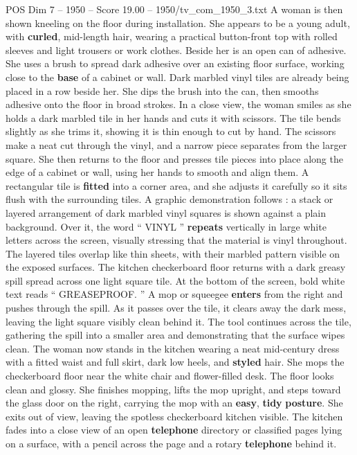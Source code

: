 \begin{textsample}{POS Dim 7 – 1950 – Score 19.00 – 1950/tv\_com\_1950\_3.txt}
A woman is then shown kneeling on the floor during installation.
She appears to be a young adult, with \textbf{curled}, mid-length hair, wearing a practical button-front top with rolled sleeves and light trousers or work clothes.
Beside her is an open can of adhesive.
She uses a brush to spread dark adhesive over an existing floor surface, working close to the \textbf{base} of a cabinet or wall.
Dark marbled vinyl tiles are already being placed in a row beside her.
She dips the brush into the can, then smooths adhesive onto the floor in broad strokes.
In a close view, the woman smiles as she holds a dark marbled tile in her hands and cuts it with scissors.
The tile bends slightly as she trims it, showing it is thin enough to cut by hand.
The scissors make a neat cut through the vinyl, and a narrow piece separates from the larger square.
She then returns to the floor and presses tile pieces into place along the edge of a cabinet or wall, using her hands to smooth and align them.
A rectangular tile is \textbf{fitted} into a corner area, and she adjusts it carefully so it sits flush with the surrounding tiles.
A graphic demonstration follows : a stack or layered arrangement of dark marbled vinyl squares is shown against a plain background.
Over it, the word “ VINYL ” \textbf{repeats} vertically in large white letters across the screen, visually stressing that the material is vinyl throughout.
The layered tiles overlap like thin sheets, with their marbled pattern visible on the exposed surfaces.
The kitchen checkerboard floor returns with a dark greasy spill spread across one light square tile.
At the bottom of the screen, bold white text reads “ GREASEPROOF. ” A mop or squeegee \textbf{enters} from the right and pushes through the spill.
As it passes over the tile, it clears away the dark mess, leaving the light square visibly clean behind it.
The tool continues across the tile, gathering the spill into a smaller area and demonstrating that the surface wipes clean.
The woman now stands in the kitchen wearing a neat mid-century dress with a fitted waist and full skirt, dark low heels, and \textbf{styled} hair.
She mops the checkerboard floor near the white chair and flower-filled desk.
The floor looks clean and glossy.
She finishes mopping, lifts the mop upright, and steps toward the glass door on the right, carrying the mop with an \textbf{easy}, \textbf{tidy} \textbf{posture}.
She exits out of view, leaving the spotless checkerboard kitchen visible.
The kitchen fades into a close view of an open \textbf{telephone} directory or classified pages lying on a surface, with a pencil across the page and a rotary \textbf{telephone} behind it.

\end{textsample}
